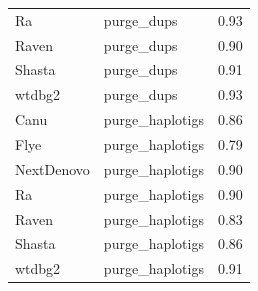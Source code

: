 \begin{table}[ht]
\begin{adjustbox}{totalheight=\baselineskip}
\begin{tabular}{llc}
Ra & purge\_dups & 0.93 \\
Raven & purge\_dups & 0.90 \\
Shasta & purge\_dups & 0.91 \\
wtdbg2 & purge\_dups & 0.93 \\
Canu & purge\_haplotigs & 0.86 \\
Flye & purge\_haplotigs & 0.79 \\
NextDenovo & purge\_haplotigs & 0.90 \\
Ra & purge\_haplotigs & 0.90 \\
Raven & purge\_haplotigs & 0.83 \\
Shasta & purge\_haplotigs & 0.86 \\
wtdbg2 & purge\_haplotigs & 0.91 \\
\hline
\end{tabular}
\end{adjustbox}
\label{tab:nanopore_happy_part1}
\end{table}

